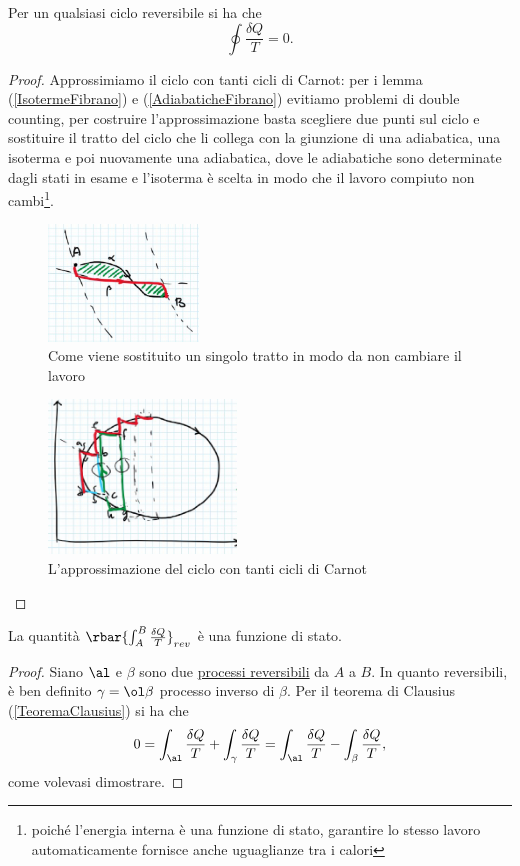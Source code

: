 \begin{theorem}\label{TeoremaClausius}
Per un qualsiasi ciclo reversibile si ha che
\[\oint\frac{\delta Q}T=0.\]
\end{theorem}
\begin{proof}
Approssimiamo il ciclo con tanti cicli di Carnot: per i lemma (\ref{IsotermeFibrano}) e (\ref{AdiabaticheFibrano}) evitiamo problemi di double counting, per costruire l'approssimazione basta scegliere due punti sul ciclo e sostituire il tratto del ciclo che li collega con la giunzione di una adiabatica, una isoterma e poi nuovamente una adiabatica, dove le adiabatiche sono determinate dagli stati in esame e l'isoterma \`e scelta in modo che il lavoro compiuto non cambi\footnote{poich\'e l'energia interna \`e una funzione di stato, garantire lo stesso lavoro automaticamente fornisce anche uguaglianze tra i calori}.

\begin{figure}[!htb]
    \centering
    \includegraphics[width=4cm]{images/Come_Approssimare.png}
    \caption{Come viene sostituito un singolo tratto in modo da non cambiare il lavoro}
\end{figure}

\begin{figure}[!htb]
    \centering
    \includegraphics[width=5cm]{images/Dimostrazione_Teorema_Carnot.png}
    \caption{L'approssimazione del ciclo con tanti cicli di Carnot}
\end{figure}


\end{proof}

\begin{corollary}
La quantit\`a $\rbar{\int_A^B\frac{\delta Q}T}_{rev}$ \`e una funzione di stato.
\end{corollary}
\begin{proof}
Siano $\al$ e $\beta$ sono due \ul{processi reversibili} da $A$ a $B$. In quanto reversibili, \`e ben definito $\gamma=\ol \beta$ processo inverso di $\beta$. Per il teorema di Clausius (\ref{TeoremaClausius}) si ha che
\[0=\int_\al \frac{\delta Q}T+\int_\gamma\frac{\delta Q}T=\int_\al \frac{\delta Q}T-\int_\beta\frac{\delta Q}T,\]
come volevasi dimostrare.
\end{proof}


